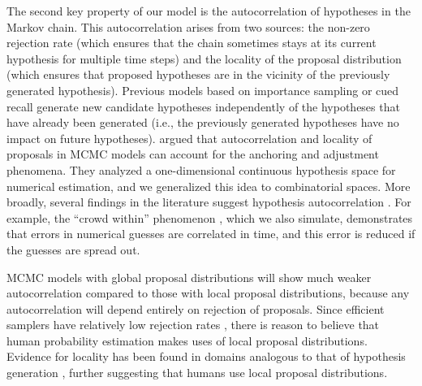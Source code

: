 The second key property of our model is the autocorrelation of hypotheses in the Markov chain. This autocorrelation arises from two sources: the non-zero rejection rate (which ensures that the chain sometimes stays at its current hypothesis for multiple time steps) and the locality of the proposal distribution (which ensures that proposed hypotheses are in the vicinity of the previously generated hypothesis). Previous models based on importance sampling or cued recall generate new candidate hypotheses independently of the hypotheses that have already been generated (i.e., the previously generated hypotheses have no impact on future hypotheses). \cite{Lieder2013} argued that autocorrelation and locality of proposals in MCMC models can account for the anchoring and adjustment phenomena. They analyzed a one-dimensional continuous hypothesis space for numerical estimation, and we generalized this idea to combinatorial spaces. More broadly, several findings in the literature suggest hypothesis autocorrelation \citep{multistability,vul08,Bonawitz2014}. For example, the ``crowd within'' phenomenon \citep{vul08}, which we also simulate, demonstrates that errors in numerical guesses are correlated in time, and this error is reduced if the guesses are spread out.

MCMC models with global proposal distributions will show much weaker autocorrelation compared to those with local proposal distributions, because any autocorrelation will depend entirely on rejection of proposals. Since efficient samplers have relatively low rejection rates \citep{robert13}, there is reason to believe that human probability estimation makes uses of local proposal distributions. Evidence for locality has been found in domains analogous to that of hypothesis generation \citep{abbott2015random,smith2013multiply}, further suggesting that humans use local proposal distributions.

